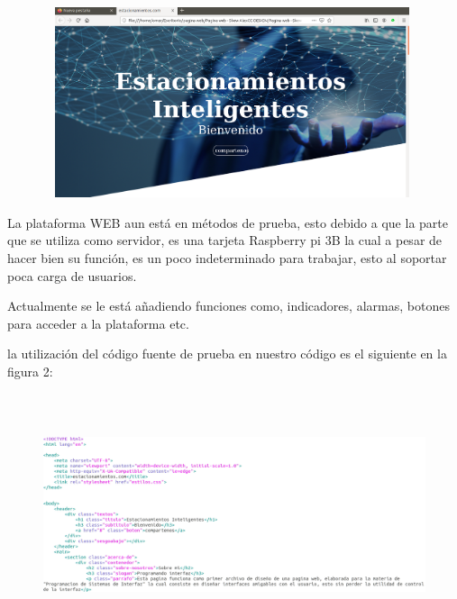 \documentclass[12pt]{article}
\begin{document}
\begin{figure}[H]
	\begin{Center}
		\includegraphics[width=4.36in,height=2.2in]{./media/image14.png}
	\end{Center}
\end{figure}



\par



\vspace{\baselineskip}
La plataforma WEB aun está en métodos de prueba, esto debido a que la parte que se utiliza como servidor, es una tarjeta Raspberry pi 3B la cual a pesar de hacer bien su función, es un poco indeterminado para trabajar, esto al soportar poca carga de usuarios.\par


\vspace{\baselineskip}
Actualmente se le está añadiendo funciones como, indicadores, alarmas, botones para acceder a la plataforma etc.\par


\vspace{\baselineskip}
la utilización del código fuente de prueba en nuestro código es el siguiente en la figura 2:\par


\vspace{\baselineskip}



\begin{figure}[H]
	\begin{Center}
		\includegraphics[width=6.93in,height=2.8in]{./media/image15.png}
	\end{Center}
\end{figure}
\end{document}
